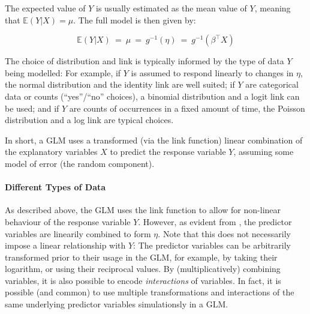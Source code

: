 The expected value of $Y$ is usually estimated as the mean value of $Y$, meaning that $\mathbb{E}(Y|X) = \mu$.
The full model is then given by:

\begin{equation}
    \label{sec:Factorization:sub:GLM:eq:GLM}
    \mathbb{E}(Y|X) ~=~ \mu ~=~ g^{-1}(\eta) ~=~ g^{-1}( \beta^\intercal X )
\end{equation}

The choice of distribution and link is typically informed by the type of data $Y$ being modelled:
For example, if $Y$ is assumed to respond linearly to changes in $\eta$,
the normal distribution and the identity link are well suited;
if $Y$ are categorical data or counts (``yes''/``no'' choices), a binomial distribution and a logit link can be used;
and if $Y$ are counts of occurrences in a fixed amount of time, the Poisson distribution and a log link are typical choices.

In short, a \ac{GLM} uses a transformed (via the link function) linear combination of the explanatory variables $X$
to predict the response variable $Y$, assuming some model of error (the random component).


\paragraph{Different Types of Data}
\label{sec:Factorization:sub:Methods:sub:GLMs:par:Data}

As described above, the \ac{GLM} uses the link function to allow for non-linear behaviour of the response variable $Y$.
However, as evident from ,
the predictor variables are linearily combined to form $\eta$.
Note that this does not necessarily impose a linear relationship with $Y$:
The predictor variables can be arbitrarily transformed prior to their usage in the \ac{GLM},
for example, by taking their logarithm, or using their reciprocal values.
By (multiplicatively) combining variables, it is also possible to encode \emph{interactions} of variables.
In fact, it is possible (and common) to use multiple transformations and interactions
of the same underlying predictor variables simulationsly in a \ac{GLM}.

